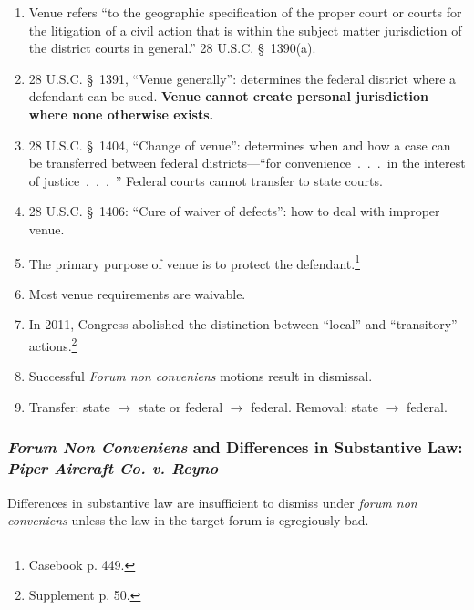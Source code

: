 \begin{enumerate}
    \item Venue refers ``to the geographic specification of the proper court 
    or courts for the litigation of a civil action that is within the subject 
    matter jurisdiction of the district courts in general.'' 28 U.S.C. \S\ 
    1390(a).
    \item 28 U.S.C. \S\ 1391, ``Venue generally'': determines the federal 
    district where a defendant can be sued. \textbf{Venue cannot create 
    personal jurisdiction where none otherwise exists.}
    \item 28 U.S.C. \S\ 1404, ``Change of venue'': determines when and how a 
    case can be transferred between federal districts---``for 
    convenience~.~.~.~in the interest of justice~.~.~.~'' Federal courts 
    cannot transfer to state courts.
    \item 28 U.S.C. \S\ 1406: ``Cure of waiver of defects'': how to deal with 
    improper venue.
    \item The primary purpose of venue is to protect the 
    defendant.\footnote{Casebook p. 449.}
    \item Most venue requirements are waivable.
    \item In 2011, Congress abolished the distinction between ``local'' and 
    ``transitory'' actions.\footnote{Supplement p. 50.}
    \item Successful \emph{Forum non conveniens} motions result in dismissal.
    \item Transfer: state $\rightarrow$ state or federal $\rightarrow$ 
    federal. Removal: state $\rightarrow$ federal.
\end{enumerate}

\subsubsection{\emph{Forum Non Conveniens} and Differences in Substantive Law: 
\emph{Piper Aircraft Co. v. Reyno}}

Differences in substantive law are insufficient to dismiss under \emph{forum 
non conveniens} unless the law in the target forum is egregiously bad.

